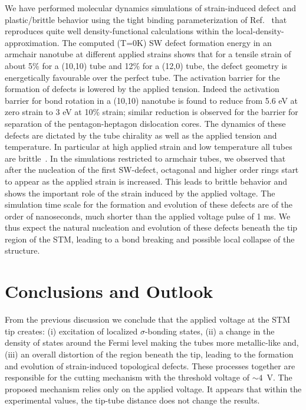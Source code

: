\begin{multicols}{2}
We have performed molecular dynamics simulations of strain-induced
defect and plastic/brittle behavior using the tight binding
parameterization of Ref.~\cite{tbmd} that reproduces quite well
density-functional calculations within the
local-density-approximation\cite{md}. The computed (T=0K) SW
defect formation energy in an armchair nanotube at different
applied strains shows that for a tensile strain of about 5\% for a
(10,10) tube and 12\% for a (12,0) tube, the defect geometry is
energetically favourable over the perfect tube\cite{defect_paul}.
The activation barrier for the formation of defects is lowered by
the applied tension. Indeed the activation barrier for bond
rotation in a (10,10) nanotube is found to reduce from 5.6 eV at
zero strain to 3 eV at 10\% strain; similar reduction is observed
for the barrier for separation of the pentagon-heptagon
dislocation cores. The dynamics of these defects are dictated by
the tube chirality as well as the applied tension and temperature.
In particular at high applied strain and low temperature all tubes
are brittle~\cite{Marco}. In the simulations restricted to
armchair tubes, we observed that after the nucleation of the first
SW-defect, octagonal and higher order rings start to appear as
the applied strain is increased. This leads to brittle behavior
and shows the important role of the strain induced by the applied
voltage. The simulation time scale for the formation and evolution
of these defects are of the order of nanoseconds, much shorter
than the applied voltage pulse of 1 ms. We thus expect the natural
nucleation and evolution of these defects beneath the tip region
of the STM, leading to a bond breaking and possible local collapse
of the structure.

\section{Conclusions and Outlook}

From the previous discussion we conclude that the applied voltage
at the STM tip creates: (i) excitation of localized
$\sigma$-bonding states, (ii) a change in the density of states
around the Fermi level making the tubes more metallic-like and,
(iii) an overall distortion of the region beneath the tip, leading
to the formation and evolution of strain-induced topological
defects. These processes together are responsible for the cutting
mechanism with the threshold voltage of $\sim 4$~V. The proposed
mechanism relies only on the applied voltage. It appears that
within the experimental values, the tip-tube distance does not
change the results.


\end{multicols}
